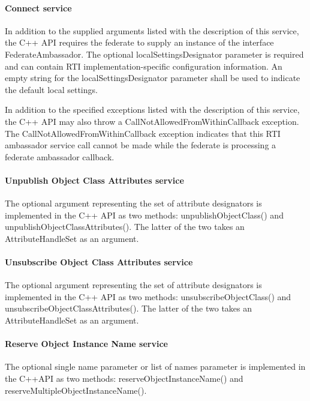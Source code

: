 \begin{compactstdpage}
    \paragraph{Connect service}

    In addition to the supplied arguments listed with the description of this service, the C++ API requires the federate to supply an instance of the interface FederateAmbassador. The optional localSettingsDesignator parameter is required and can contain RTI implementation-specific configuration information. An empty string for the localSettingsDesignator parameter shall be used to indicate the default local settings.

    In addition to the specified exceptions listed with the description of this service, the C++ API may also throw a CallNotAllowedFromWithinCallback exception. The CallNotAllowedFromWithinCallback exception indicates that this RTI ambassador service call cannot be made while the federate is processing a federate ambassador callback.

    \paragraph{Unpublish Object Class Attributes service}

    The optional argument representing the set of attribute designators is implemented in the C++ API as two methods: unpublishObjectClass() and unpublishObjectClassAttributes(). The latter of the two takes an AttributeHandleSet as an argument.

    \paragraph{Unsubscribe Object Class Attributes service}

    The optional argument representing the set of attribute designators is implemented in the C++ API as two methods: unsubscribeObjectClass() and unsubscribeObjectClassAttributes(). The latter of the two takes an AttributeHandleSet as an argument.

    \paragraph{Reserve Object Instance Name service}

    The optional single name parameter or list of names parameter is implemented in the C++API as two methods: reserveObjectInstanceName() and reserveMultipleObjectInstanceName().


\end{compactstdpage}
